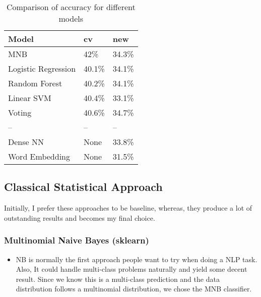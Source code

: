 \documentclass[11pt]{article}
\begin{document}
\begin{table}[h]
  \begin{center}
 \begin{tabular}{|l|l|l|}
 
       \hline
       Model & cv 
       & new\\
       \hline\hline
       MNB & 42\% & 34.3\% \\
       Logistic Regression & 40.1\% & 34.1\% \\
       Random Forest & 40.2\% & 34.1\% \\
       Linear SVM & 40.4\% & 33.1\% \\
       Voting & 40.6\% & 34.7\% \\
       -- & -- & --\\
       Dense NN & None & 33.8\% \\
       Word Embedding & None & 31.5\% \\
       \hline
 
 \end{tabular}
 \caption{Comparison of accuracy for different models}\label{accuracy}
  \end{center}
 \end{table}


\subsection{Classical Statistical Approach}

Initially, I prefer these approaches to be baseline, 
whereas, they produce a lot of outstanding results and becomes my 
final choice.

\subsubsection{Multinomial Naive Bayes (sklearn)}
\begin{itemize}
      \item 
            NB is normally the first approach people 
            want to try when doing a NLP task. Also, It could handle multi-class
            problems naturally and yield some decent result. Since we know this
            is a multi-class prediction and the data distribution follows a multinomial
            distribution, we chose the MNB classifier.
\end{itemize}
\end{document}

